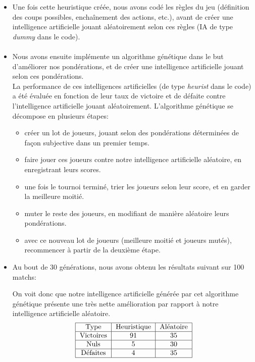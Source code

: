 \documentclass[10pt]{article}
\begin{document}
\begin{enumerate}
\begin{itemize}
\paragraph{}
\item Une fois cette heuristique créée, nous avons codé les règles du jeu (définition des coups possibles, enchaînement des actions, etc.), avant de créer une intelligence artificielle jouant aléatoirement selon ces règles (IA de type \textit{dummy} dans le code). 
\paragraph{}
\item Nous avons ensuite implémente un algorithme génétique dans le but d'améliorer nos pondérations, et de créer une intelligence artificielle jouant selon ces pondérations. \\
La performance de ces intelligences artificielles (de type \textit{heurist} dans le code) a été évaluée en fonction de leur taux de victoire et de défaite contre l'intelligence artificielle jouant aléatoirement. 
L'algorithme génétique se décompose en plusieurs étapes: 
\begin{itemize}
    \item créer un lot de joueurs, jouant selon des pondérations déterminées de façon subjective dans un premier temps. 
    \item faire jouer ces joueurs contre notre intelligence artificielle aléatoire, en enregistrant leurs scores. 
    \item une fois le tournoi terminé, trier les joueurs selon leur score, et en garder la meilleure moitié. 
    \item muter le reste des joueurs, en modifiant de manière aléatoire leurs pondérations. 
    \item avec ce nouveau lot de joueurs (meilleure moitié et joueurs mutés), recommencer à partir de la deuxième étape.   
\end{itemize}

\item Au bout de 30 générations, nous avons obtenu les résultats suivant sur 100 matchs: 

On voit donc que notre intelligence artificielle générée par cet algorithme génétique présente une très nette amélioration par rapport à notre intelligence artificielle aléatoire.
$$
\begin{tabular}{ |c|c|c| }
\hline
Type & Heuristique & Aléatoire\\
\hline
Victoires & 91 & 35 \\
\hline
Nuls & 5 & 30 \\
\hline
 Défaites  & 4 & 35 \\
 \hline
\end{tabular}
$$

\end{itemize}
\end{enumerate}
\end{document}
